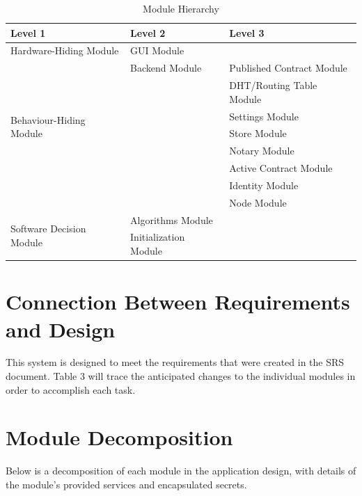 \documentclass{article}
\begin{document}
\begin{table}[h!]
	\centering
	\begin{tabular}{p{} p{} p{}}
		\toprule
		\textbf{Level 1} & \textbf{Level 2} & \textbf{Level 3}\\
		\midrule
		
		{Hardware-Hiding Module} & GUI Module & ~ \\
		\midrule
		
		\multirow{7}{0.4\textwidth}{Behaviour-Hiding Module} & {Backend Module} & Published Contract Module \\
		& ~ & DHT/Routing Table Module\\
		& ~ & Settings Module\\
		& ~ & Store Module\\
		& ~ & Notary Module\\
		& ~ & Active Contract Module\\
		& ~ & Identity Module\\
		& ~ & Node Module\\
		\midrule
		
		\multirow{3}{0.4\textwidth}{Software Decision Module} & Algorithms Module & ~ \\
		& Initialization Module & ~ \\
		\bottomrule
		
	\end{tabular}
	\caption{Module Hierarchy}
	\label{TblMH}
\end{table}



\section*{Connection Between Requirements and Design}
This system is designed to meet the requirements that were created in the SRS document. Table 3 will trace the anticipated changes to the individual modules in order to accomplish each task.


\section*{Module Decomposition}
Below is a decomposition of each module in the application design, with details of the module's provided services and encapsulated secrets.
\end{document}

